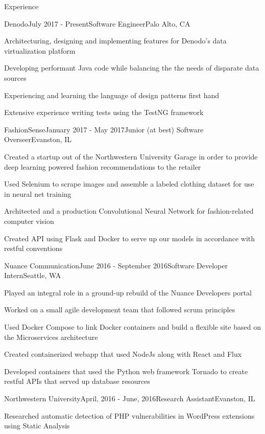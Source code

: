 \documentclass{resume} %
\begin{document}
\begin{rSection}{Experience}

\begin{rSubsection}{Denodo}{July 2017 - Present}{Software Engineer}{Palo Alto, CA}
\item Architecturing, designing and implementing features for Denodo's data virtualization platform
\item Developing performant Java code while balancing the the needs of disparate data sources
\item Experiencing and learning the language of design patterns first hand
\item Extensive experience writing tests using the TestNG framework
\end{rSubsection}

\begin{rSubsection}{FashionSense}{January 2017 - May 2017}{Junior (at best) Software Overseer}{Evanston, IL}
\item Created a startup out of the Northwestern University Garage in order to provide deep learning powered fashion recommendations to the retailer
\item Used Selenium to scrape images and assemble a labeled clothing dataset for use in neural net training
\item Architected and a production Convolutional Neural Network for fashion-related computer vision
\item Created API using Flask and Docker to serve up our models in accordance with restful conventions
\end{rSubsection}


\begin{rSubsection}{Nuance Communication}{June 2016 - September 2016}{Software Developer Intern}{Seattle, WA}
\item Played an integral role in a ground-up rebuild of the Nuance Developers portal
\item Worked on a small agile development team that followed scrum principles
\item Used Docker Compose to link Docker containers and build a flexible site based on the
Microservices architecture
\item Created containerized webapp that used NodeJs along with React and Flux
\item Developed containers that used the Python web framework Tornado to create restful APIs that served up database resources
\end{rSubsection}


\begin{rSubsection}{Northwestern University}{April, 2016 - June, 2016}{Research Assistant}{Evanston, IL}
\item Researched automatic detection of PHP vulnerabilities in WordPress extensions using Static
Analysis
\end{rSubsection}

\end{rSection}
\end{document}
